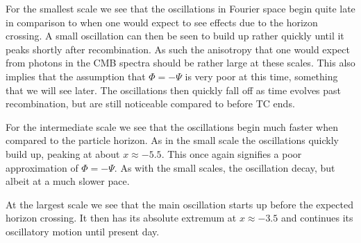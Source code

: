 \documentclass[%
reprint,
 amsmath,amssymb,
 aps,
]{revtex4-2}
\begin{document}
For the smallest scale we see that the oscillations in Fourier space begin quite late in comparison to when one would expect to see effects due to the horizon crossing. A small oscillation can then be seen to build up rather quickly until it peaks shortly after recombination. As such the anisotropy that one would expect from photons in the CMB spectra should be rather large at these scales. This also implies that the assumption that $\Phi=-\Psi$ is very poor at this time, something that we will see later. The oscillations then quickly fall off as time evolves past recombination, but are still noticeable compared to before TC ends.

For the intermediate scale we see that the oscillations begin much faster when compared to the particle horizon. As in the small scale the oscillations quickly build up, peaking at about $x\approx-5.5$. This once again signifies a poor approximation of $\Phi=-\Psi$. As with the small scales, the oscillation decay, but albeit at a much slower pace.

At the largest scale we see that the main oscillation starts up before the expected horizon crossing. It then has its absolute extremum at $x\approx-3.5$ and continues its oscillatory motion until present day.
\end{document}
